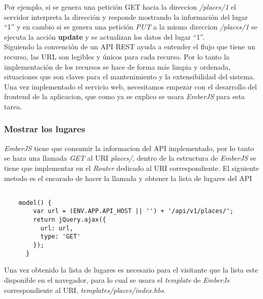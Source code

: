  Por ejemplo, si se genera una petición GET hacia la direccion
  \mbox{\emph{/places/1}}  el servidor interpreta la dirección y responde
  mostrando la información del lugar “1” y en cambio si se genera
  una petición \emph{PUT} a la misma direccion \emph{/places/1} se ejecuta la acción \textbf{update} y se actualizan los datos del lugar ``1''. \\


  Siguiendo la convención de un API REST ayuda a entender el flujo que tiene un recurso,
  las URL son legibles y únicos para cada recurso. Por lo tanto la implementación   de los recursos se hace de forma más limpia y ordenada, situaciones que son   claves para el mantenimiento y la extensibilidad del sistema. \\


Una vez implementado el servicio web, necesitamos empezar con el desarrollo del frontend de la aplicacion, que como ya se explico se usara \emph{EmberJS} para esta tarea. \\


\subsubsection{Mostrar los lugares}


\emph{EmberJS} tiene que consumir la informacion del API implementado, por lo tanto se hara una llamada \emph{GET} al URI \emph{places/}, dentro de la estructura de \emph{EmberJS} se tiene que implementar en el \emph{Router} dedicado al URI correspondiente. El siguiente metodo es el encarado de hacer la llamada y obtener la lista de lugares del API

\begin{center}
  \begin{lstlisting}[label=model_places_index,caption=Obtener la lista de lugares del API]

    model() {
        var url = (ENV.APP.API_HOST || '') + '/api/v1/places/';
        return jQuery.ajax({
          url: url,
          type: 'GET'
        });
      }

  \end{lstlisting}
\end{center}

Una vez obtenido la lista de lugares es necesario para el visitante que la lista este disponible en el navegador, para lo cual se usara el \emph{template} de \emph{EmberJs} correspondiente al URI, \emph{templates/places/index.hbs}.


